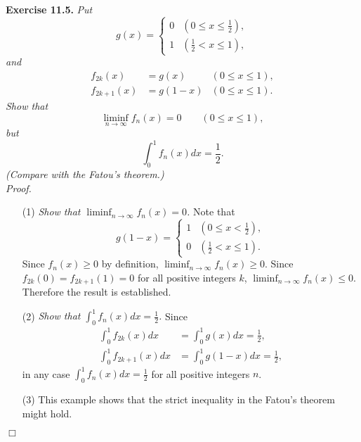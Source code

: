 \documentclass{article}
\begin{document}



\textbf{Exercise 11.5.}
\emph{Put
  \begin{equation*}
    g(x) =
    \begin{cases}
      0 & (0 \leq x \leq \frac{1}{2}), \\
      1 & (\frac{1}{2} < x \leq 1),
    \end{cases}
  \end{equation*}
  and
  \begin{align*}
    f_{2k}(x) &= g(x) &(0 \leq x \leq 1), \\
    f_{2k+1}(x) &= g(1-x) &(0 \leq x \leq 1).
  \end{align*}
Show that
\[
  \liminf_{n \to \infty} f_n(x) = 0
  \qquad
  (0 \leq x \leq 1),
\]
but
\[
  \int_{0}^{1} f_n(x)dx = \frac{1}{2}.
\]
(Compare with the Fatou's theorem.)} \\

\emph{Proof.}
\begin{enumerate}
\item[(1)]
  \emph{Show that $\liminf_{n \to \infty} f_n(x) = 0$.}
  Note that
  \begin{equation*}
    g(1-x) =
    \begin{cases}
      1 & (0 \leq x < \frac{1}{2}), \\
      0 & (\frac{1}{2} < x \leq 1).
    \end{cases}
  \end{equation*}
  Since $f_n(x) \geq 0$ by definition,
  $\liminf_{n \to \infty} f_n(x) \geq 0$.
  Since $f_{2k}(0) = f_{2k+1}(1) = 0$ for all positive integers $k$,
  $\liminf_{n \to \infty} f_n(x) \leq 0$.
  Therefore the result is established.

\item[(2)]
  \emph{Show that $\int_{0}^{1} f_n(x)dx = \frac{1}{2}$.}
  Since
  \begin{align*}
    \int_{0}^{1} f_{2k}(x)dx
    &= \int_{0}^{1} g(x)dx = \frac{1}{2}, \\
    \int_{0}^{1} f_{2k+1}(x)dx
    &= \int_{0}^{1} g(1-x)dx = \frac{1}{2},
  \end{align*}
  in any case $\int_{0}^{1} f_n(x)dx = \frac{1}{2}$ for all positive integers $n$.

\item[(3)]
  This example shows that the strict inequality in the Fatou's theorem
  might hold.
\end{enumerate}
$\Box$ \\\\
\end{document}
